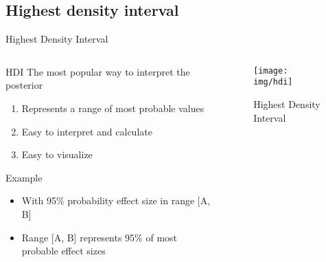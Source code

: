 \documentclass{beamer}
\begin{document}
\subsection{Highest density interval}
\begin{frame}{Highest Density Interval}
    \begin{columns}
    \begin{column}{0.5\linewidth}
    HDI The most popular way to interpret the posterior
    \begin{enumerate}
        \item Represents a range of most probable values
        \item Easy to interpret and calculate
        \item Easy to visualize
    \end{enumerate}
    \begin{block}{Example}
    \begin{itemize}
        \item With 95\% probability effect size in range [A, B]
        \item Range [A, B] represents 95\% of most probable effect sizes
    \end{itemize}
    \end{block}
    \end{column}
    \begin{column}{0.5\linewidth}
    \begin{figure}
        \centering
        \texttt{[image: img/hdi]}
        \caption{Highest Density Interval}
    \end{figure}
    \end{column}
    \end{columns}
\end{frame}
\end{document}
